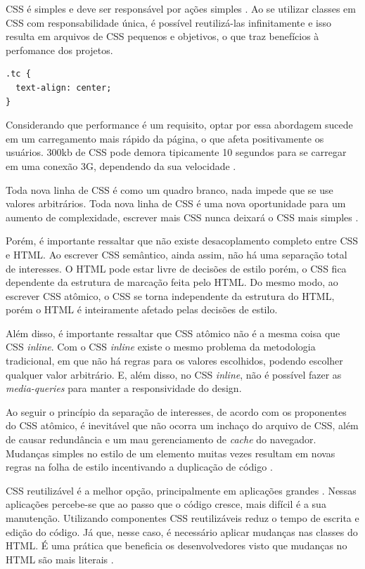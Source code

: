 CSS é simples e deve ser
responsável por ações simples \cite{ardeljan}. Ao se utilizar classes em CSS com
responsabilidade única, é possível reutilizá-las infinitamente e isso
resulta em arquivos de CSS pequenos e objetivos, o que traz benefícios à perfomance
dos projetos. 

\begin{verbatim}
.tc {  
  text-align: center;  
}
\end{verbatim}

Considerando que performance é um requisito, optar por essa abordagem
sucede em um carregamento mais rápido da página, o que afeta
positivamente os usuários. 300kb de CSS pode demora tipicamente
10 segundos para se carregar em uma conexão 3G, dependendo
da sua velocidade \cite{ardeljan}.

Toda nova linha de CSS é como um quadro branco, nada impede que se use valores arbitrários. Toda nova linha de CSS é uma nova oportunidade para um aumento de complexidade, escrever mais CSS nunca deixará o CSS mais simples \cite{wathan}.

Porém, é importante ressaltar que não existe desacoplamento completo
entre CSS e HTML. Ao escrever CSS semântico, ainda assim, não há uma
separação total de interesses. O HTML pode estar livre de decisões de
estilo porém, o CSS fica dependente da estrutura de marcação feita pelo
HTML. Do mesmo modo, ao escrever CSS atômico, o CSS se torna
independente da estrutura do HTML, porém o HTML é inteiramente afetado
pelas decisões de estilo.

Além disso, é importante ressaltar que CSS atômico não é a mesma coisa que CSS \emph{inline}. Com o CSS \emph{inline} existe o mesmo problema da metodologia tradicional, em que não há regras para os valores escolhidos, podendo escolher qualquer valor arbitrário. E, além disso, no CSS \emph{inline}, não é possível fazer as \emph{media-queries} para manter a responsividade do design.

Ao seguir o princípio da separação de interesses, de acordo com os proponentes do CSS atômico, é inevitável que não ocorra um
inchaço do arquivo de CSS, além de causar redundância e um mau
gerenciamento de \emph{cache} do navegador. Mudanças simples no estilo
de um elemento muitas vezes resultam em novas regras na folha de estilo
incentivando a duplicação de código \cite{koblentz}.

CSS reutilizável é a melhor
opção, principalmente em aplicações grandes \cite{gallagher}. Nessas aplicações
percebe-se que ao passo que o código cresce, mais difícil é a sua
manutenção. Utilizando componentes CSS reutilizáveis reduz o tempo de
escrita e edição do código. Já que, nesse caso, é necessário aplicar
mudanças nas classes do HTML. É uma prática que
beneficia os desenvolvedores visto que mudanças no HTML são mais
literais \cite{gallagher}.

